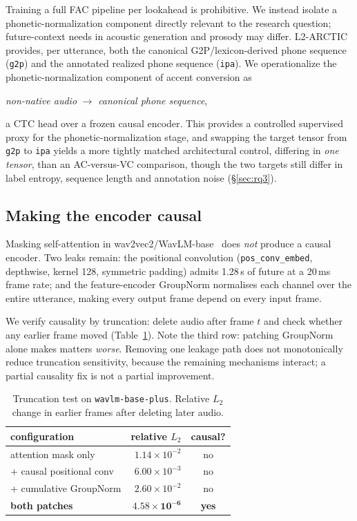 \documentclass[journal]{IEEEtran}
\begin{document}
Training a full FAC pipeline per lookahead is prohibitive. We instead isolate
a phonetic-normalization component directly relevant to the research question;
future-context needs in acoustic generation and prosody may differ. L2-ARCTIC~\cite{l2arctic2018}
provides, per utterance, both the canonical G2P/lexicon-derived phone sequence
(\texttt{g2p}) and the annotated realized phone sequence (\texttt{ipa}). We operationalize the phonetic-normalization component of accent conversion as
\begin{center}
\emph{non-native audio} $\rightarrow$ \emph{canonical phone sequence},
\end{center}
a CTC head over a frozen causal encoder. This provides a controlled supervised proxy for the
phonetic-normalization stage, and swapping the target tensor from
\texttt{g2p} to \texttt{ipa} yields a more tightly matched architectural
control, differing in \emph{one tensor}, than an AC-versus-VC comparison,
though the two targets still differ in label entropy, sequence length and
annotation noise (\S\ref{sec:rq3}).

\subsection{Making the encoder causal}
\label{sec:causal}

Masking self-attention in wav2vec2/WavLM-base~\cite{wavlm2022, wav2vec2} does
\emph{not} produce a causal encoder. Two leaks remain: the positional
convolution (\texttt{pos\_conv\_embed}, depthwise, kernel 128, symmetric
padding) admits 1.28\,s of future at a 20\,ms frame rate; and the
feature-encoder GroupNorm normalises each channel over the entire utterance,
making every output frame depend on every input frame.

We verify causality by truncation: delete audio after frame $t$ and check
whether any earlier frame moved (Table~\ref{tab:causal}). Note the third row:
patching GroupNorm alone makes matters \emph{worse}. Removing one leakage path
does not monotonically reduce truncation sensitivity, because the remaining
mechanisms interact; a partial causality fix is not a partial improvement.

\begin{table}[t]
\centering\small
\caption{Truncation test on \texttt{wavlm-base-plus}. Relative $L_2$ change in
earlier frames after deleting later audio.}
\label{tab:causal}
\begin{tabular}{lrc}
\toprule
configuration & relative $L_2$ & causal? \\
\midrule
attention mask only        & $1.14\times10^{-2}$ & no \\
\quad + causal positional conv & $6.00\times10^{-3}$ & no \\
\quad + cumulative GroupNorm   & $2.60\times10^{-2}$ & no \\
\textbf{both patches}      & $\mathbf{4.58\times10^{-6}}$ & \textbf{yes} \\
\bottomrule
\end{tabular}
\end{table}
\end{document}
